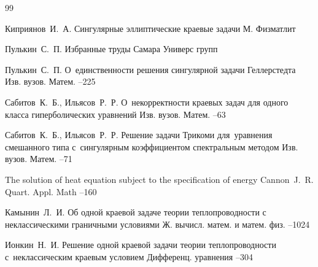 \begin{thebibliography}{99}

\by Киприянов~И.~А.
\book Сингулярные эллиптические краевые задачи
\publaddr М.
\publ Физматлит

\by Пулькин~С.~П.
\book Избранные труды
\publaddr Самара
\publ Универс групп

\by Пулькин~С.~П.
\paper О~единственности решения сингулярной задачи Геллерстедта
\jour Изв. вузов. Матем.
--225

\by Сабитов~К.~Б., Ильясов~Р.~Р.
\paper О~некорректности краевых задач для одного класса гиперболических
уравнений
\jour Изв. вузов. Матем.
--63


\by Сабитов~К.~Б., Ильясов~Р.~Р.
\paper Решение задачи Трикоми для~уравнения смешанного типа с~сингулярным коэффициентом
спектральным методом
\jour Изв. вузов. Матем.
--71

\paper The solution of heat equation subject to the specification of energy
\by Cannon~J.~R.
\jour Quart. Appl. Math
--160

\by Камынин~Л.~И.
\paper Об одной краевой задаче теории теплопроводности с неклассическими граничными условиями
\jour Ж. вычисл. матем. и матем. физ.
--1024

\by Ионкин~Н.~И.
\paper Решение одной краевой задачи теории теплопроводности с~неклассическим краевым условием
\jour Дифференц. уравнения
--304


\end{thebibliography}
